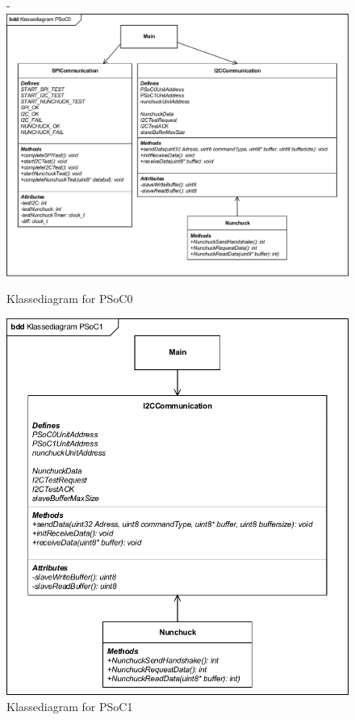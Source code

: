 \begin{figure}[H]
	\begin{adjustwidth}{-2cm}{-\rightmargin}
		\centering
		\includegraphics[width=1.35\textwidth]{DesignOgImplementering/images/PSoC0KlassediagramOversigt.pdf}
		\caption{Klassediagram for PSoC0}
		\label{figure:klassediagramPSoC0}
	\end{adjustwidth}
\end{figure}

\begin{figure}[H]
	\centering
	\includegraphics[width=\textwidth]{DesignOgImplementering/images/PSoC1KlassediagramOversigt.pdf}
	\caption{Klassediagram for PSoC1}
	\label{figure:klassediagramPSoC1}
\end{figure}

